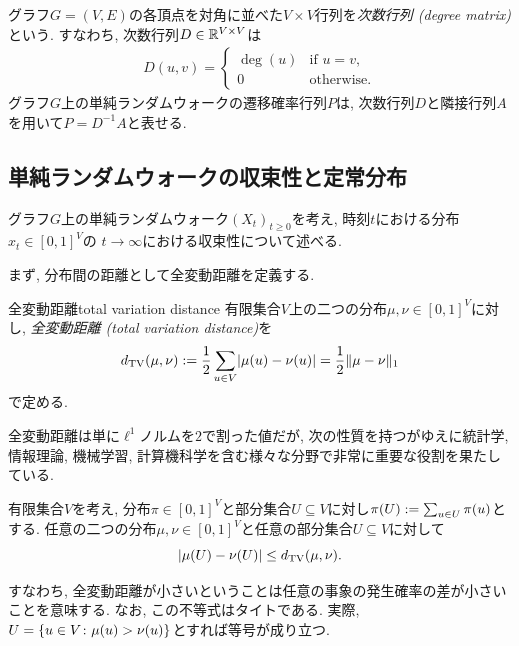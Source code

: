   グラフ$G=(V,E)$の各頂点を対角に並べた$V\times V$行列を\emph{次数行列 (degree matrix)}という.
  すなわち, 次数行列$D\in \Real^{V\times V}$は
  \begin{align*}
    D(u,v) = \begin{cases}
      \deg(u)	& \text{if }u=v,\\
      0 & \text{otherwise}.
    \end{cases}
  \end{align*}
  グラフ$G$上の単純ランダムウォークの遷移確率行列$P$は, 次数行列$D$と隣接行列$A$を用いて$P=D^{-1}A$と表せる.

\subsection{単純ランダムウォークの収束性と定常分布} \label{sec:SRW convergence}
グラフ$G$上の単純ランダムウォーク$(X_t)_{t\ge 0}$を考え, 時刻$t$における分布$x_t \in [0,1]^V$の
$t\to \infty$における収束性について述べる.

まず, 分布間の距離として全変動距離を定義する.
\begin{definition}{全変動距離}{total variation distance}
  有限集合$V$上の二つの分布$\mu,\nu \in[0,1]^V$に対し, \emph{全変動距離 (total variation distance)}を
  \[
    \dtv (\mu ,\nu ) \defeq \frac{1}{2} \sum_{u\in V}\abs{\mu(u) - \nu(u)} = \frac{1}{2} \norm{\mu - \nu}_1
  \]
  で定める.
\end{definition}
全変動距離は単に$\ell^1$ノルムを$2$で割った値だが, 次の性質を持つがゆえに統計学, 情報理論, 機械学習, 計算機科学を含む様々な分野で非常に重要な役割を果たしている.
\begin{proposition}{}{}
  有限集合$V$を考え, 分布$\pi\in[0,1]^V$と部分集合$U\subseteq V$に対し$\pi(U)\defeq\sum_{u\in U}\pi(u)$とする.
  任意の二つの分布$\mu,\nu\in[0,1]^V$と任意の部分集合$U\subseteq V$に対して
  \[
    \abs*{ \mu(U) - \nu(U) } \le \dtv(\mu,\nu).
  \]
\end{proposition}
すなわち,
全変動距離が小さいということは任意の事象の発生確率の差が小さいことを意味する.
なお, この不等式はタイトである.
実際, $U=\cbra*{ u\in V \colon \mu(u) > \nu(u) }$とすれば等号が成り立つ.

